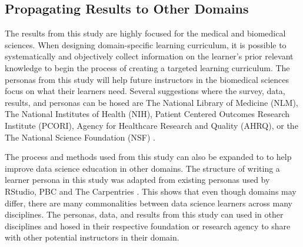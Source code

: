 \documentclass[020-persona\_validation.tex]{subfiles}
\begin{document}
    \subsection{Propagating Results to Other Domains}

        The results from this study are highly focused for the medical and biomedical sciences.
        When designing domain-specific learning curriculum, it is possible to systematically
        and objectively collect information on the learner's prior relevant knowledge to begin the process of
        creating a targeted learning curriculum.
        The personas from this study will help future instructors in the biomedical sciences
        focus on what their learners need.
        Several suggestions where the survey, data, results, and personas can be hosed are
        The National Library of Medicine (NLM),
        The National Institutes of Health (NIH),
        Patient Centered Outcomes Research Institute (PCORI),
        Agency for Healthcare Research and Quality (AHRQ), or the
        The National Science Foundation (NSF)
        \cite{payneBiomedicalInformaticsMeets2018}.

        The process and methods used from this study can also be expanded to
        to help improve data science education in other domains.
        The structure of writing a learner persona in this study was adapted from existing personas
        used by RStudio, PBC and The Carpentries
        \cite{rstudioLearnerPersonas2019, softwarecarpentryLearnerProfiles}.
        This shows that even though domains may differ,
        there are many commonalities between data science learners across many disciplines.
        The personas, data, and results from this study can used in other disciplines and
        hosed in their respective foundation or research agency to share with other potential instructors
        in their domain.
\end{document}
